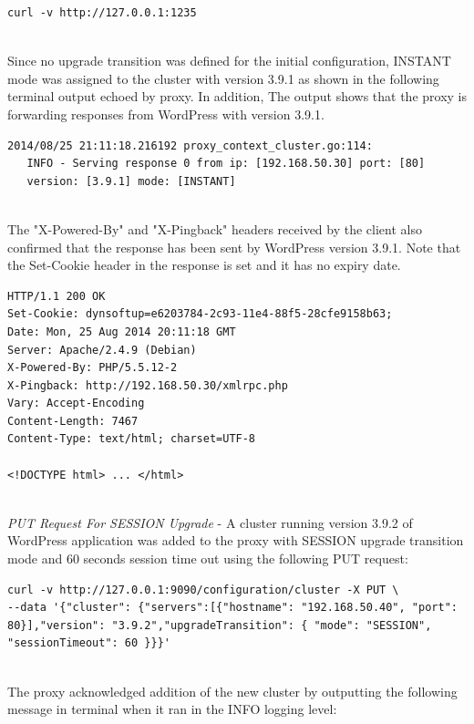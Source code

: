 \documentclass[a4paper,11pt,twoside]{report}
\begin{document}
\begin{lstlisting}[language=terminal]
curl -v http://127.0.0.1:1235
\end{lstlisting} 

\noindent\\Since no upgrade transition was defined for the initial configuration, INSTANT mode was assigned to the cluster with version 3.9.1 as shown in the following terminal output echoed by proxy. In addition, The output shows that the proxy is forwarding responses from WordPress with version 3.9.1. \smallskip

\begin{lstlisting}[language=terminal] 
2014/08/25 21:11:18.216192 proxy_context_cluster.go:114:     
   INFO - Serving response 0 from ip: [192.168.50.30] port: [80] 
   version: [3.9.1] mode: [INSTANT]
\end{lstlisting} 

\noindent\\
The "X-Powered-By" and "X-Pingback" headers received by the client also confirmed that the response has been sent by WordPress version 3.9.1.  Note that the Set-Cookie header in the response is set and it has no expiry date. \smallskip 

\begin{lstlisting}[language=terminal] 
HTTP/1.1 200 OK
Set-Cookie: dynsoftup=e6203784-2c93-11e4-88f5-28cfe9158b63;
Date: Mon, 25 Aug 2014 20:11:18 GMT
Server: Apache/2.4.9 (Debian)
X-Powered-By: PHP/5.5.12-2
X-Pingback: http://192.168.50.30/xmlrpc.php
Vary: Accept-Encoding
Content-Length: 7467
Content-Type: text/html; charset=UTF-8

<!DOCTYPE html> ... </html>
\end{lstlisting} 

\noindent\\
\textit{PUT Request For SESSION Upgrade} - A cluster running version 3.9.2 of WordPress application was added to the proxy with SESSION upgrade transition mode and 60 seconds session time out using the following PUT request: \smallskip 

\begin{lstlisting}[language=terminal] 
curl -v http://127.0.0.1:9090/configuration/cluster -X PUT \
--data '{"cluster": {"servers":[{"hostname": "192.168.50.40", "port": 80}],"version": "3.9.2","upgradeTransition": { "mode": "SESSION", "sessionTimeout": 60 }}}'
\end{lstlisting}

\noindent\\
The proxy acknowledged addition of the new cluster by outputting the following message in terminal when it ran in the INFO logging level: \smallskip 
\end{document}
